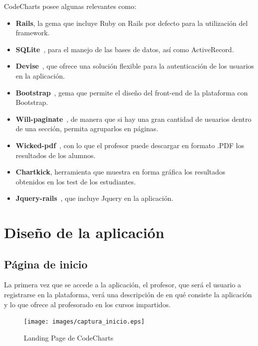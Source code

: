 CodeCharts posee algunas relevantes como:

\begin{itemize}
    \item \textbf{Rails}, la gema que incluye Ruby on Rails por defecto para la utilización del framework.
    \item \textbf{SQLite}~\cite{SQLite}, para el manejo de las bases de datos, así como ActiveRecord.
    \item \textbf{Devise}~\cite{Devise}, que ofrece una solución flexible para la autenticación de los usuarios en la aplicación.
    \item \textbf{Bootstrap}~\cite{BootstrapGem}, gema que permite el diseño del front-end de la plataforma con Bootstrap.
    \item \textbf{Will-paginate}~\cite{Paginate}, de manera que si hay una gran cantidad de usuarios dentro de una sección, permita agruparlos en páginas.
    \item \textbf{Wicked-pdf}~\cite{WickedPDF}, con lo que el profesor puede descargar en formato .PDF los resultados de los alumnos.
    \item \textbf{Chartkick}, herramienta que muestra en forma gráfica los resultados obtenidos en los test de los estudiantes.
    \item \textbf{Jquery-rails}~\cite{JqueryRails}, que incluye Jquery en la aplicación. 
\end{itemize}


\section{Diseño de la aplicación}
\label{1:sec:2}

\subsection{Página de inicio}
\label{1:sec:1}

La primera vez que se accede a la aplicación, el profesor, que será el usuario a registrarse en la plataforma, verá una descripción de en qué consiste la aplicación y lo que ofrece al profesorado en los cursos impartidos.

\begin{figure}[!th]
\begin{center}
\texttt{[image: images/captura\_inicio.eps]}
\caption{Landing Page de CodeCharts}
\label{fig:11}
\end{center}
\end{figure}

